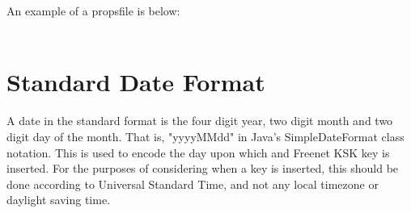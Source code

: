 \documentclass[12pt,a4paper]{article}
\begin{document}
An example of a propsfile is below: \\
\\

\section{Standard Date Format}
\label{standard_date}
A date in the standard format is the four digit year, two digit month and two digit day of the
month. That is, "yyyyMMdd" in Java's SimpleDateFormat class notation. This is used to encode the day
upon which and Freenet KSK key is inserted. For the purposes of considering when a key is inserted,
this should be done according to Universal Standard Time, and not any local timezone or daylight
saving time.
\end{document}

